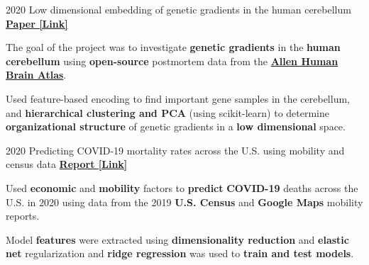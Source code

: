 \begin{cventries}
  \cventry
    {2020} %
    {Low dimensional embedding of genetic gradients in the human cerebellum} %
    {\href{https://papers.ssrn.com/sol3/papers.cfm?abstract_id=3797269}{\textbf{Paper [Link]}}}
    {}
    {
      \begin{cvitems} %
      	\item {The goal of the project was to investigate \textbf{genetic gradients} in the \textbf{human cerebellum} using \textbf{open-source} postmortem data from the \href{https://human.brain-map.org/}{\textbf{Allen Human Brain Atlas}}.}
        \item {Used feature-based encoding to find important gene samples in the cerebellum, and \textbf{hierarchical clustering and PCA} (using scikit-learn) to determine \textbf{organizational structure} of genetic gradients in a \textbf{low dimensional} space.}
      \end{cvitems}
    }
    
  \cventry
    {2020} %
    {Predicting COVID-19 mortality rates across the U.S. using mobility and census data} %
    {\href{https://drive.google.com/file/d/1l9TLGLmstkJsvOJQPxHe_f35b4fEkDU4/view}{\textbf{Report [Link]}}}
    {}
    {
      \begin{cvitems} %
      	\item {Used \textbf{economic} and \textbf{mobility} factors to \textbf{predict} \textbf{COVID-19} deaths across the U.S. in 2020 using data from the 2019 \textbf{U.S. Census} and \textbf{Google Maps} mobility reports.}
      	\item {Model \textbf{features} were extracted using \textbf{dimensionality reduction} and \textbf{elastic net} regularization and \textbf{ridge regression} was used to \textbf{train and test models}.}
      \end{cvitems}
    }
    
\end{cventries}
